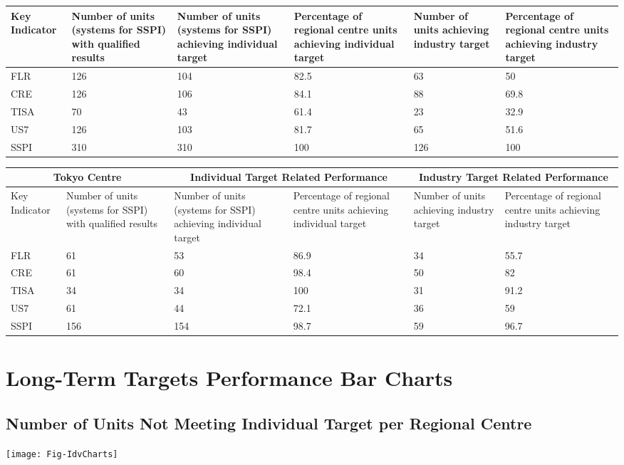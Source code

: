 \documentclass{article}
\begin{document}
\begin{center}
\begin{tabular}{|p{1.5cm}||p{2.5cm}||p{2.5cm}|p{2.5cm}||p{2.5cm}|p{2.5cm}|}
\hline 
Key Indicator & Number of units (systems for SSPI) with qualified results & Number of units (systems for SSPI) achieving individual target & Percentage of regional centre units achieving individual target & Number of units achieving industry target & Percentage of regional centre units achieving industry target \\
\hline 
FLR & 126 & 104 & 82.5 & 63 & 50 \\
\hline 
CRE & 126 & 106 & 84.1 & 88 & 69.8 \\
\hline 
TISA & 70 & 43 & 61.4 & 23 & 32.9 \\
\hline 
US7 & 126 & 103 & 81.7 & 65 & 51.6 \\
\hline 
SSPI & 310 & 310 & 100 & 126 & 100 \\
\hline 
\end{tabular} \end{center}\begin{center} \begin{tabular}{|p{1.5cm}||p{2.5cm}||p{2.5cm}|p{2.5cm}||p{2.5cm}|p{2.5cm}|} \hline\multicolumn{2}{|c||}{\textbf{ Tokyo Centre }} & \multicolumn{2}{|c||}{Individual Target Related Performance} & \multicolumn{2}{|c|}{Industry Target Related Performance} \\
\hline 
Key Indicator & Number of units (systems for SSPI) with qualified results & Number of units (systems for SSPI) achieving individual target & Percentage of regional centre units achieving individual target & Number of units achieving industry target & Percentage of regional centre units achieving industry target \\
\hline 
FLR & 61 & 53 & 86.9 & 34 & 55.7 \\
\hline 
CRE & 61 & 60 & 98.4 & 50 & 82 \\
\hline 
TISA & 34 & 34 & 100 & 31 & 91.2 \\
\hline 
US7 & 61 & 44 & 72.1 & 36 & 59 \\
\hline 
SSPI & 156 & 154 & 98.7 & 59 & 96.7 \\
\hline 
\end{tabular} \end{center}
\clearpage
\section*{Long-Term Targets Performance Bar Charts}
\subsection*{Number of Units Not Meeting Individual Target per Regional Centre}
\texttt{[image: Fig-IdvCharts]}
\end{document}
